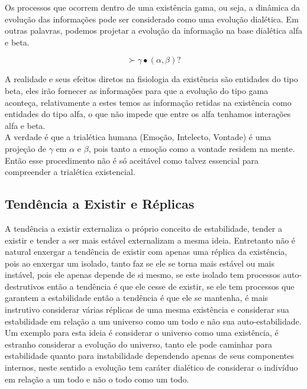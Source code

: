 \documentclass[10pt,a4paper]{report}
\begin{document}
Os processos que ocorrem dentro de uma existência gama, ou seja, a dinâmica da evolução das informações pode ser considerado como uma evolução dialética. Em outras palavras, podemos projetar a evolução da informação na base dialética alfa e beta.

$$\succ \gamma \bullet (\alpha, \beta) \text{?}$$

A realidade e seus efeitos diretos na fisiologia da existência são entidades do tipo beta, eles irão fornecer as informações para que a evolução do tipo gama aconteça, relativamente a estes temos as informação retidas na existência como entidades do tipo alfa, o que não impede que entre os alfa tenhamos interações alfa e beta.\\

A verdade é que a trialética humana (Emoção, Intelecto, Vontade) é uma projeção de $\gamma$ em $\alpha$ e $\beta$, pois tanto a emoção como a vontade residem na mente. Então esse procedimento não é só aceitável como talvez essencial para compreender a trialética existencial.

\subsection{Tendência a Existir e Réplicas}

\hspace{\baselineskip}

A tendência a existir externaliza o próprio conceito de estabilidade, tender a existir e tender a ser mais estável externalizam a mesma ideia. Entretanto não é natural enxergar a tendência de existir com apenas uma réplica da existência, pois ao enxergar um isolado, tanto faz se ele se torna mais estável ou mais instável, pois ele apenas depende de si mesmo, se este isolado tem processos auto-destrutivos então a tendência é que ele cesse de existir, se ele tem processos que garantem a estabilidade então a tendência é que ele se mantenha, é mais instrutivo considerar várias réplicas de uma mesma existência e considerar sua estabilidade em relação a um universo como um todo e não sua auto-estabilidade. Um exemplo para esta ideia é considerar o universo como uma existência, é estranho considerar a evolução do universo, tanto ele pode caminhar para estabilidade quanto para instabilidade dependendo apenas de seus componentes internos, neste sentido a evolução tem caráter dialético de considerar o indivíduo em relação a um todo e não o todo como um todo.

\hspace{\baselineskip}
\end{document}
